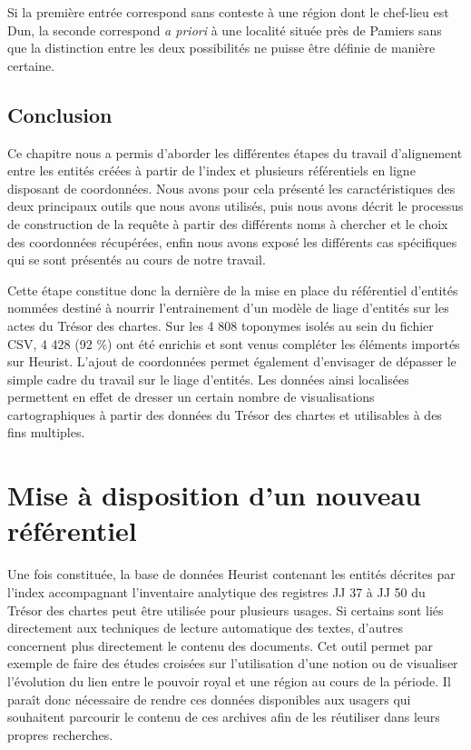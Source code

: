\documentclass[a4paper,12pt,twoside]{book}
\begin{document}
	\noindent Si la première entrée correspond sans conteste à une région dont le chef-lieu est Dun, la seconde correspond \textit{a priori} à une localité située près de Pamiers sans que la distinction entre les deux possibilités ne puisse être définie de manière certaine.
	
	\section*{Conclusion}
	
	Ce chapitre nous a permis d'aborder les différentes étapes du travail d'alignement entre les entités créées à partir de l'index et plusieurs référentiels en ligne disposant de coordonnées. Nous avons pour cela présenté les caractéristiques des deux principaux outils que nous avons utilisés, puis nous avons décrit le processus de construction de la requête à partir des différents noms à chercher et le choix des coordonnées récupérées, enfin nous avons exposé les différents cas spécifiques qui se sont présentés au cours de notre travail.
	
	Cette étape constitue donc la dernière de la mise en place du référentiel d'entités nommées destiné à nourrir l'entrainement d'un modèle de liage d'entités sur les actes du Trésor des chartes. Sur les 4 808 toponymes isolés au sein du fichier CSV, 4 428 (92 \%) ont été enrichis et sont venus compléter les éléments importés sur Heurist. L'ajout de coordonnées permet également d'envisager de dépasser le simple cadre du travail sur le liage d'entités. Les données ainsi localisées permettent en effet de dresser un certain nombre de visualisations cartographiques à partir des données du Trésor des chartes et utilisables à des fins multiples.
	
		
	\chapter{Mise à disposition d'un nouveau référentiel}
	
	Une fois constituée, la base de données Heurist contenant les entités décrites par l'index accompagnant l'inventaire analytique des registres JJ 37 à JJ 50 du Trésor des chartes peut être utilisée pour plusieurs usages. Si certains sont liés directement aux techniques de lecture automatique des textes, d'autres concernent plus directement le contenu des documents. Cet outil permet par exemple de faire des études croisées sur l'utilisation d'une notion ou de visualiser l'évolution du lien entre le pouvoir royal et une région au cours de la période. Il paraît donc nécessaire de rendre ces données disponibles aux usagers qui souhaitent parcourir le contenu de ces archives afin de les réutiliser dans leurs propres recherches.
	
\end{document}
